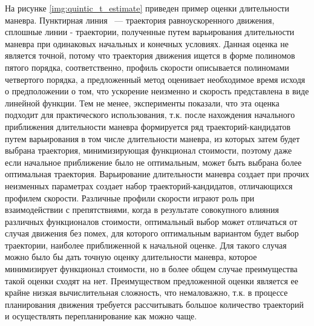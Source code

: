 На рисунке \ref{img:quintic_t_estimate} приведен пример оценки длительности маневра. Пунктирная линия ~---
траектория равноускоренного движения, сплошные линии - траектории, полученные путем варьирования длительности
маневра при одинаковых начальных и конечных условиях. Данная оценка не является точной, потому что траектория движения
ищется в форме полиномов пятого порядка, соответственно, профиль скорости описывается полиномами четвертого порядка,
а предложенный метод оценивает необходимое время исходя о предположении о том, что ускорение неизменно и скорость
представлена в виде линейной функции. Тем не менее, эксперименты показали, что эта оценка подходит для практического
использования, т.к. после нахождения начального приближения длительности маневра формируется ряд траекторий-кандидатов
путем варьирования в том числе длительности маневра, из которых затем будет выбрана траектория, минимизирующая
функционал стоимости, поэтому даже если начальное приближение было не оптимальным, может быть выбрана более оптимальная
траектория. Варьирование длительности маневра создает при прочих неизменных параметрах создает набор
траекторий-кандидатов, отличающихся профилем скорости. Различные профили скорости играют роль при взаимодействии
с препятствиями, когда в результате совокупного влияния различных функционалов стоимости, оптимальный выбор может
отличаться от случая движения без помех, для которого оптимальным вариантом будет выбор траектории, наиболее
приближенной к начальной оценке. Для такого случая можно было бы дать точную оценку длительности маневра, которое
минимизирует функционал стоимости, но в более общем случае преимущества такой оценки сходят на нет. Преимуществом
предложенной оценки является ее крайне низкая вычислительная сложность, что немаловажно, т.к. в процессе планирования
движения требуется рассчитывать большое количество траекторий и осуществлять перепланирование как можно чаще.

